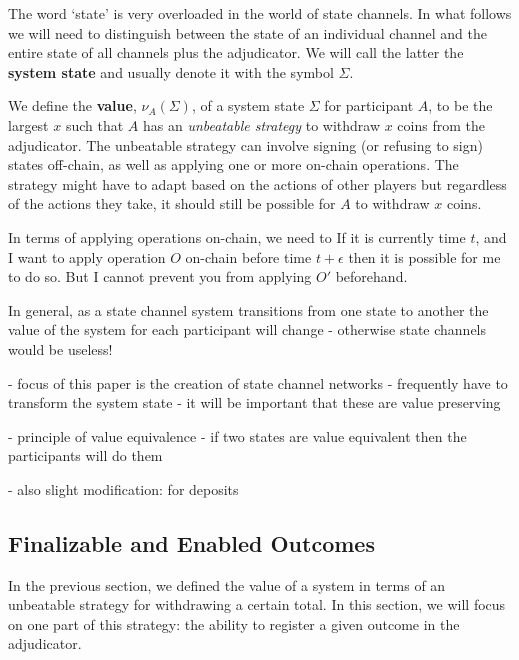\documentclass{article}
\theoremstyle{definition}
\begin{document}
The word `state' is very overloaded in the world of state channels.
In what follows we will need to distinguish between the state of an individual channel and
the entire state of all channels plus the adjudicator.
We will call the latter the \textbf{system state} and usually denote it with the symbol $\Sigma$.

We define the \textbf{value}, $\nu_A(\Sigma)$, of a system state $\Sigma$ for participant $A$,
to be the largest $x$ such that $A$ has an \textit{unbeatable strategy} to withdraw $x$
coins from the adjudicator.
The unbeatable strategy can involve signing (or refusing to sign) states off-chain, as well as
applying one or more on-chain operations.
The strategy might have to adapt based on the actions of other players but regardless of
the actions they take, it should still be possible for $A$ to withdraw $x$ coins.

In terms of applying operations on-chain, we need to 
If it is currently time $t$, and I want to apply operation $O$ on-chain before time $t + \epsilon$
then it is possible for me to do so.
But I cannot prevent you from applying $O'$ beforehand.

In general, as a state channel system transitions from one state to another the value of the system
for each participant will change - otherwise state channels would be useless!

- focus of this paper is the creation of state channel networks
- frequently have to transform the system state
- it will be important that these are value preserving

- principle of value equivalence - if two states are value equivalent then the participants will do them

- also slight modification: for deposits

\subsection{Finalizable and Enabled Outcomes}

In the previous section, we defined the value of a system in terms of an unbeatable strategy
for withdrawing a certain total.
In this section, we will focus on one part of this strategy: the ability to register a given
outcome in the adjudicator.
\end{document}
